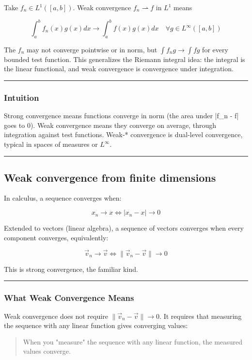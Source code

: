 Take \(f_n \in L^1([a,b])\). Weak convergence \(f_n \rightharpoonup f\) in \(L^1\) means

\[
\int_a^b f_n(x) g(x) dx \to \int_a^b f(x) g(x) dx \quad \forall g \in L^\infty([a,b])
\]

The \(f_n\) may not converge pointwise or in norm, but \(\int f_n g \to \int f g\) for every bounded test function. This generalizes the Riemann integral idea: the integral is the linear functional, and weak convergence is convergence under integration.

\hrule

\subsubsection{Intuition}

Strong convergence means functions converge in norm (the area under |f\_n - f| goes to 0). Weak convergence means they converge on average, through integration against test functions. Weak-* convergence is dual-level convergence, typical in spaces of measures or \(L^\infty\).

\hrule

\subsection{Weak convergence from finite dimensions}

In calculus, a sequence converges when:

\[
x_n \to x \iff |x_n - x| \to 0
\]

Extended to vectors (linear algebra), a sequence of vectors converges when every component converges, equivalently:

\[
\vec{v}_n \to \vec{v} \iff \|\vec{v}_n - \vec{v}\| \to 0
\]

This is strong convergence, the familiar kind.

\hrule

\subsubsection{What Weak Convergence Means}

Weak convergence does not require \(\|\vec{v}_n - \vec{v}\| \to 0\). It requires that measuring the sequence with any linear function gives converging values:

\begin{quote}
When you "measure" the sequence with any linear function, the measured values converge.
\end{quote}


